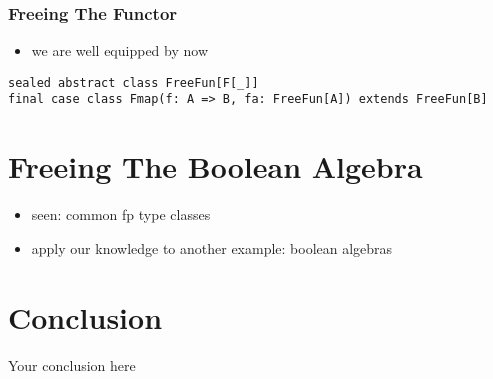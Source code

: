 \documentclass{beamer}
\begin{document}
\begin{frame}[fragile]
  \frametitle{Freeing The Functor}
  \begin{itemize}
  \item we are well equipped by now
  \end{itemize}
  \begin{verbatim}
sealed abstract class FreeFun[F[_]]
final case class Fmap(f: A => B, fa: FreeFun[A]) extends FreeFun[B]
  \end{verbatim}
\end{frame}

\section{Freeing The Boolean Algebra}\label{sec:free-boolean-algebra}

\begin{frame}
  \begin{itemize}
  \item seen: common fp type classes
  \item apply our knowledge to another example: boolean algebras
  \end{itemize}
\end{frame}

\section{Conclusion}\label{sec:conclusion}

\begin{frame}
  \begin{center}
    \huge
    Your conclusion here
  \end{center}
\end{frame}
\end{document}

